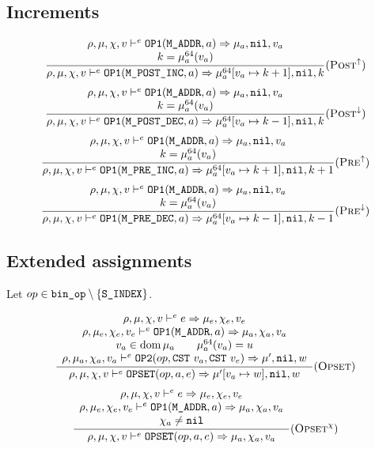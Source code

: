 \subsection{Increments}
\[\dfrac{\begin{array}{c}
    \rho,\mu,\chi,v \vdash^e \texttt{OP1}(\texttt{M\_ADDR}, a)\Rightarrow \mu_a,\texttt{nil},v_a \\
    k = \mu_a^{64}(v_a)
\end{array}}{\rho,\mu,\chi,v \vdash^e \texttt{OP1}(\texttt{M\_POST\_INC}, a) \Rightarrow \mu_a^{64}[v_a\mapsto k+1],\texttt{nil},k} (\textsc{Post}^\uparrow)\]
\[\dfrac{\begin{array}{c}
    \rho,\mu,\chi,v \vdash^e \texttt{OP1}(\texttt{M\_ADDR}, a)\Rightarrow \mu_a,\texttt{nil},v_a \\
    k = \mu_a^{64}(v_a)
\end{array}}{\rho,\mu,\chi,v \vdash^e \texttt{OP1}(\texttt{M\_POST\_DEC}, a) \Rightarrow \mu_a^{64}[v_a\mapsto k-1],\texttt{nil},k} (\textsc{Post}^\downarrow)\]
\[\dfrac{\begin{array}{c}
    \rho,\mu,\chi,v \vdash^e \texttt{OP1}(\texttt{M\_ADDR}, a)\Rightarrow \mu_a,\texttt{nil},v_a \\
    k = \mu_a^{64}(v_a)
\end{array}}{\rho,\mu,\chi,v \vdash^e \texttt{OP1}(\texttt{M\_PRE\_INC}, a) \Rightarrow \mu_a^{64}[v_a\mapsto k+1],\texttt{nil},k+1} (\textsc{Pre}^\uparrow)\]
\[\dfrac{\begin{array}{c}
    \rho,\mu,\chi,v \vdash^e \texttt{OP1}(\texttt{M\_ADDR}, a)\Rightarrow \mu_a,\texttt{nil},v_a \\
    k = \mu_a^{64}(v_a)
\end{array}}{\rho,\mu,\chi,v \vdash^e \texttt{OP1}(\texttt{M\_PRE\_DEC}, a) \Rightarrow \mu_a^{64}[v_a\mapsto k-1],\texttt{nil},k-1} (\textsc{Pre}^\downarrow)\]


\subsection{Extended assignments}
Let \(op\in \texttt{bin\_op}\setminus \{ \texttt{S\_INDEX} \}\).

\[\dfrac{\begin{array}{c}
    \rho,\mu,\chi,v \gives^e e \tto \mu_e,\chi_e,v_e \\
    \rho,\mu_e,\chi_e,v_e \gives^e \t{OP1}(\t{M\_ADDR}, a) \tto \mu_a,\chi_a,v_a \\
    v_a\in\dom\mu_a \qquad \mu_a^{64}(v_a) = u \\
    \rho,\mu_a,\chi_a,v_a \gives^e \t{OP2}(op, \t{CST}\ v_a, \t{CST}\ v_e) \tto \mu',\nil,w
\end{array}}{\rho,\mu,\chi,v \gives^e \t{OPSET}(op, a, e) \tto \mu'[v_a\mapsto w],\nil,w} \rule{Opset}{}\]
\[\dfrac{\begin{array}{c}
    \rho,\mu,\chi,v \vdash^e e\Rightarrow \mu_e,\chi_e,v_e \\
    \rho,\mu_e,\chi_e,v_e \vdash^e \texttt{OP1}(\texttt{M\_ADDR}, a) \Rightarrow \mu_a,\chi_a,v_a \\
    \chi_a\ne\texttt{nil} \\
\end{array}}{\rho,\mu,\chi,v \vdash^e \texttt{OPSET}(op, a, e) \Rightarrow \mu_a,\chi_a,v_a} (\textsc{Opset}^\chi)\]

